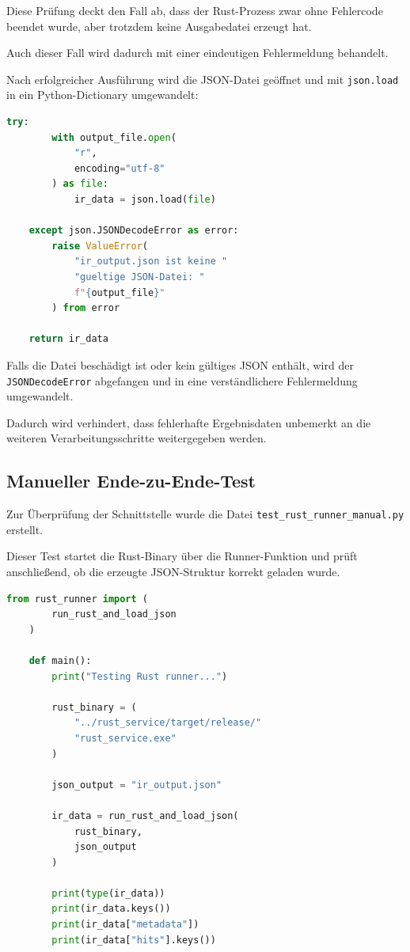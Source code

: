 \documentclass{article}
\begin{document}
    Diese Prüfung deckt den Fall ab, dass der Rust-Prozess zwar ohne Fehlercode
    beendet wurde, aber trotzdem keine Ausgabedatei erzeugt hat.

    Auch dieser Fall wird dadurch mit einer eindeutigen Fehlermeldung behandelt.

    Nach erfolgreicher Ausführung wird die JSON-Datei geöffnet und mit
    \texttt{json.load} in ein Python-Dictionary umgewandelt:

    \begin{lstlisting}[language=Python]
    try:
        with output_file.open(
            "r",
            encoding="utf-8"
        ) as file:
            ir_data = json.load(file)

    except json.JSONDecodeError as error:
        raise ValueError(
            "ir_output.json ist keine "
            "gueltige JSON-Datei: "
            f"{output_file}"
        ) from error

    return ir_data
    \end{lstlisting}

    Falls die Datei beschädigt ist oder kein gültiges JSON enthält, wird der
    \texttt{JSONDecodeError} abgefangen und in eine verständlichere Fehlermeldung
    umgewandelt.

    Dadurch wird verhindert, dass fehlerhafte Ergebnisdaten unbemerkt an die
    weiteren Verarbeitungsschritte weitergegeben werden.

    \subsection{Manueller Ende-zu-Ende-Test}
    \label{subsec:end-to-end-test}

    Zur Überprüfung der Schnittstelle wurde die Datei
    \texttt{test\_rust\_runner\_manual.py} erstellt.

    Dieser Test startet die Rust-Binary über die Runner-Funktion und prüft
    anschließend, ob die erzeugte JSON-Struktur korrekt geladen wurde.

    \begin{lstlisting}[language=Python]
    from rust_runner import (
        run_rust_and_load_json
    )

    def main():
        print("Testing Rust runner...")

        rust_binary = (
            "../rust_service/target/release/"
            "rust_service.exe"
        )

        json_output = "ir_output.json"

        ir_data = run_rust_and_load_json(
            rust_binary,
            json_output
        )

        print(type(ir_data))
        print(ir_data.keys())
        print(ir_data["metadata"])
        print(ir_data["hits"].keys())
    \end{lstlisting}
\end{document}
